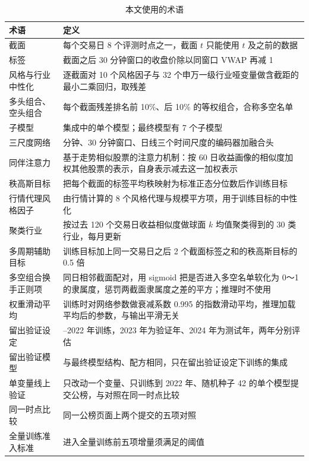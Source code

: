 \documentclass[UTF8,a4paper,zihao=-4,fontset=none]{ctexart}
\newcommand{\tabsetup}{\small\linespread{1.15}\selectfont\renewcommand{\arraystretch}{1.25}}
\begin{document}
\begin{table}[htbp]
\caption{本文使用的术语}\label{tab:terms}
\centering\tabsetup
\begin{tabularx}{\textwidth}{@{}p{8.2em}>{\raggedright\arraybackslash}X@{}}
\toprule
术语 & 定义\\
\midrule
截面 & 每个交易日 8 个评测时点之一，截面 $t$ 只能使用 $t$ 及之前的数据\\
标签 & 截面之后 30 分钟窗口的收盘价除以同窗口 VWAP 再减 1\\
风格与行业中性化 & 逐截面对 10 个风格因子与 32 个申万一级行业哑变量做含截距的最小二乘回归，取残差\\
多头组合、空头组合 & 每个截面残差排名前 10\%、后 10\% 的等权组合，合称多空名单\\
子模型 & 集成中的单个模型；最终模型有 7 个子模型\\
三尺度网络 & 1 分钟、30 分钟窗口、日线三个时间尺度的编码器加融合头\\
同伴注意力 & 基于走势相似股票的注意力机制：按 60 日收益画像的相似度加权其他股票的表示，自身表示减去这一加权表示\\
秩高斯目标 & 把每个截面的标签平均秩映射为标准正态分位数后作训练目标\\
行情代理风格因子 & 由行情计算的 8 个风格代理与规模平方项，用于训练目标的中性化\\
聚类行业 & 按过去 120 个交易日收益相似度做球面 $k$ 均值聚类得到的 30 类行业，每月更新\\
多周期辅助目标 & 训练目标加上同一交易日之后 2 个截面标签之和的秩高斯目标的 0.5 倍\\
多空组合换手正则项 & 同日相邻截面配对，用 sigmoid 把是否进入多空名单软化为 0～1 的隶属度，惩罚两截面隶属度之差的平方；推理时不使用\\
权重滑动平均 & 训练时对网络参数做衰减系数 0.995 的指数滑动平均，推理加载平均后的参数，与输出平滑无关\\
留出验证设定 & 2020–2022 年训练，2023 年为验证年、2024 年为测试年，两年分别评估\\
留出验证模型 & 与最终模型结构、配方相同，只在留出验证设定下训练的集成\\
单变量线上验证 & 只改动一个变量、只训练到 2022 年、随机种子 42 的单个模型提交公榜，与对照在同一时点比较\\
同一时点比较 & 同一公榜页面上两个提交的五项对照\\
全量训练准入标准 & 进入全量训练前五项增量须满足的阈值\\
\bottomrule
\end{tabularx}
\end{table}
\end{document}
